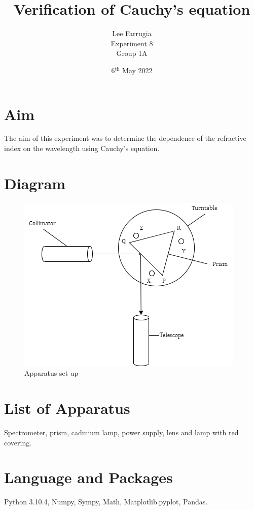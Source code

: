 \documentclass[12pt, a4paper]{article}
\title{Verification of Cauchy's equation}
\author{Lee Farrugia \\ Experiment 8 \\ Group 1A}
\date{6$^{\text{th}}$ May 2022}
\begin{document}
\maketitle
\thispagestyle{titlepagestyle}
\pagestyle{mystyle}

\section*{Aim}
The aim of this experiment was to determine the dependence of the refractive index on the wavelength using Cauchy's equation.

\section*{Diagram}
\begin{figure}[H]
    \centering
    \includegraphics[width = \textwidth]{Experiment 8 Diagram.png}
    \caption{Apparatus set up}
    \label{fig:Set up}
\end{figure}

\section*{List of Apparatus}
Spectrometer, prism, cadmium lamp, power supply, lens and lamp with red covering.

\section*{Language and Packages}
Python 3.10.4, Numpy, Sympy, Math, Matplotlib.pyplot, Pandas.
\end{document}
